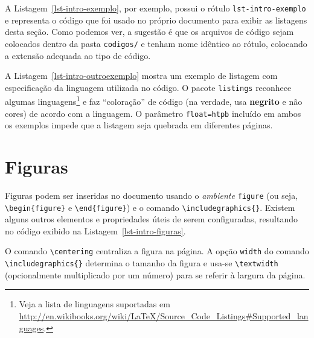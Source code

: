 A Listagem~\ref{lst-intro-exemplo}, por exemplo, possui o rótulo \texttt{lst-intro-exemplo} e representa o código que foi usado no próprio documento para exibir as listagens desta seção. Como podemos ver, a sugestão é que os arquivos de código sejam colocados dentro da pasta \texttt{codigos/} e tenham nome idêntico ao rótulo, colocando a extensão adequada ao tipo de código.



A Listagem~\ref{lst-intro-outroexemplo} mostra um exemplo de listagem com especificação da linguagem utilizada no código. O pacote \texttt{listings} reconhece algumas linguagens\footnote{Veja a lista de linguagens suportadas em \url{http://en.wikibooks.org/wiki/LaTeX/Source\_Code\_Listings\#Supported_languages}.} e faz ``coloração'' de código (na verdade, usa \textbf{negrito} e não cores) de acordo com a linguagem. O parâmetro \texttt{float=htpb} incluído em ambos os exemplos impede que a listagem seja quebrada em diferentes páginas.





\section{Figuras}
\label{sec-fundteo-figuras}

Figuras podem ser inseridas no documento usando o \emph{ambiente} \texttt{figure} (ou seja, \texttt{\textbackslash begin\{figure\}} e \texttt{\textbackslash end\{figure\}}) e o comando \texttt{\textbackslash includegraphics\{\}}. Existem alguns outros elementos e propriedades úteis de serem configuradas, resultando no código exibido na Listagem~\ref{lst-intro-figuras}.



O comando \texttt{\textbackslash centering} centraliza a figura na página. A opção \texttt{width} do comando \texttt{\textbackslash includegraphics\{\}} determina o tamanho da figura e usa-se \texttt{\textbackslash textwidth} (opcionalmente multiplicado por um número) para se referir à largura da página.

